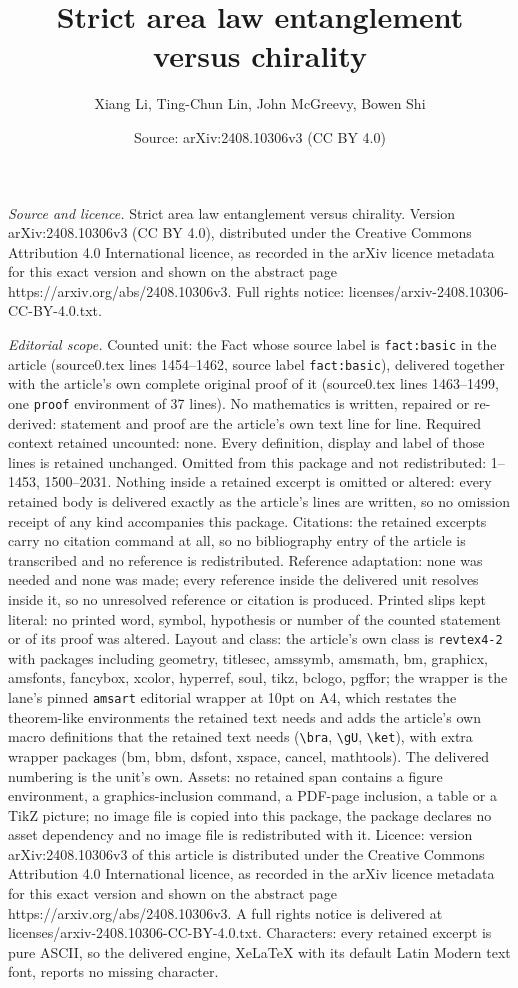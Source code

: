 \documentclass[10pt,a4paper]{amsart}
\title[Strict area law entanglement versus chirality]{Strict area law entanglement versus chirality}
\author{Xiang Li, Ting-Chun Lin, John McGreevy, Bowen Shi}
\date{Source: arXiv:2408.10306v3 (CC BY 4.0)}
\begin{document}
\maketitle

\noindent\emph{Source and licence.} Strict area law entanglement versus chirality. Version arXiv:2408.10306v3 (CC BY 4.0), distributed under the Creative Commons Attribution 4.0 International licence, as recorded in the arXiv licence metadata for this exact version and shown on the abstract page https://arxiv.org/abs/2408.10306v3. Full rights notice: licenses/arxiv-2408.10306-CC-BY-4.0.txt.\par\smallskip

\noindent\textit{Editorial scope.} Counted unit: the Fact whose source label is \texttt{fact:basic} in the article (source0.tex lines 1454--1462, source label \texttt{fact:basic}), delivered together with the article's own complete original proof of it (source0.tex lines 1463--1499, one \texttt{proof} environment of 37 lines). No mathematics is written, repaired or re-derived: statement and proof are the article's own text line for line. Required context retained uncounted: none. Every definition, display and label of those lines is retained unchanged. Omitted from this package and not redistributed: 1--1453, 1500--2031. Nothing inside a retained excerpt is omitted or altered: every retained body is delivered exactly as the article's lines are written, so no omission receipt of any kind accompanies this package. Citations: the retained excerpts carry no citation command at all, so no bibliography entry of the article is transcribed and no reference is redistributed. Reference adaptation: none was needed and none was made; every reference inside the delivered unit resolves inside it, so no unresolved reference or citation is produced. Printed slips kept literal: no printed word, symbol, hypothesis or number of the counted statement or of its proof was altered. Layout and class: the article's own class is \texttt{revtex4-2} with packages including geometry, titlesec, amssymb, amsmath, bm, graphicx, amsfonts, fancybox, xcolor, hyperref, soul, tikz, bclogo, pgffor; the wrapper is the lane's pinned \texttt{amsart} editorial wrapper at 10pt on A4, which restates the theorem-like environments the retained text needs and adds the article's own macro definitions that the retained text needs (\texttt{\textbackslash bra}, \texttt{\textbackslash gU}, \texttt{\textbackslash ket}), with extra wrapper packages (bm, bbm, dsfont, xspace, cancel, mathtools). The delivered numbering is the unit's own. Assets: no retained span contains a figure environment, a graphics-inclusion command, a PDF-page inclusion, a table or a TikZ picture; no image file is copied into this package, the package declares no asset dependency and no image file is redistributed with it. Licence: version arXiv:2408.10306v3 of this article is distributed under the Creative Commons Attribution 4.0 International licence, as recorded in the arXiv licence metadata for this exact version and shown on the abstract page https://arxiv.org/abs/2408.10306v3. A full rights notice is delivered at licenses/arxiv-2408.10306-CC-BY-4.0.txt. Characters: every retained excerpt is pure ASCII, so the delivered engine, XeLaTeX with its default Latin Modern text font, reports no missing character.
\end{document}
